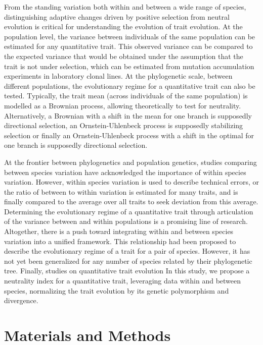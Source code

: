 \documentclass{article}
\begin{document}
From the standing variation both within and between a wide range of species, distinguishing adaptive changes driven by positive selection from neutral evolution is critical for understanding the evolution of trait evolution.
At the population level, the variance between individuals of the same population can be estimated for any quantitative trait.
This observed variance can be compared to the expected variance that would be obtained under the assumption that the trait is not under selection, which can be estimated from mutation accumulation experiments in laboratory clonal lines.
At the phylogenetic scale, between different populations, the evolutionary regime for a quantitative trait can also be tested.
Typically, the trait mean (across individuals of the same population) is modelled as a Brownian process, allowing theoretically to test for neutrality.
Alternatively, a Brownian with a shift in the mean for one branch is supposedly directional selection, an Ornstein-Uhlenbeck process is supposedly stabilizing selection or finally an Ornstein-Uhlenbeck process with a shift in the optimal for one branch is supposedly directional selection\cite{catalan_drift_2019}.

At the frontier between phylogenetics and population genetics, studies comparing between species variation have acknowledged the importance of within species variation\cite{whitehead_variation_2006}.
However, within species variation is used to describe technical errors, or the ratio of between to within variation is estimated for many traits, and is finally compared to the average over all traits to seek deviation from this average\cite{rohlfs_modeling_2014, rohlfs_phylogenetic_2015}.
Determining the evolutionary regime of a quantitative trait through articulation of the variance between and within populations is a promising line of research\cite{kostikova_bridging_2016, gaboriau_multiplatform_2020}.
Altogether, there is a push toward integrating within and between species variation into a unified framework.
This relationship had been proposed to describe the evolutionary regime of a trait for a pair of species\cite{lande_genetic_1980, turelli_heritable_1984}.
However, it has not yet been generalized for any number of species related by their phylogenetic tree.
Finally, studies on quantitative trait evolution
In this study, we propose a neutrality index for a quantitative trait, leveraging data within and between species, normalizing the trait evolution by its genetic polymorphism and divergence.

\section{Materials and Methods}\label{sec:materials-and-methods}
\end{document}
